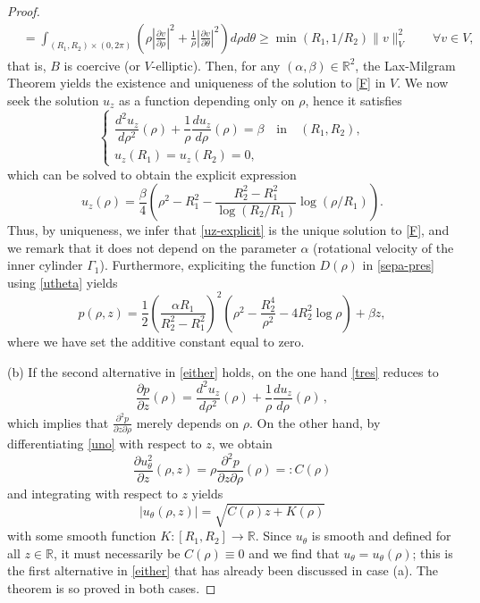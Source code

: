 \documentclass[a4paper,11pt]{amsart}
\numberwithin{equation}{section}
\numberwithin{figure}{section}
\begin{document}
\begin{proof}
\begin{equation*}
\begin{aligned}
				&= \int_{(R_1,R_2)\times (0,2\pi)} \left( \rho \left|\frac{\partial v}{\partial \rho}\right|^2 + \frac{1}{\rho}\left|\frac{\partial v}{\partial \theta}\right|^2  \right) d\rho d\theta\geq \min (R_1, 1/R_2)\|v\|^2_V\qquad\forall v\in V,
			\end{aligned}
		\end{equation*} that is, $B$ is coercive (or $V$-elliptic). Then, for any $(\alpha, \beta)\in \mathbb{R}^2$, the Lax-Milgram Theorem yields the existence and uniqueness of the solution to \eqref{F} in $V$. We now seek the solution $u_z$ as a function depending only on $\rho$, hence it satisfies
		\begin{equation*}
			\begin{cases}
				\dfrac{d^2 {u_z}}{d\rho^2}(\rho) +\dfrac{1}{\rho}\dfrac{d{u_z}}{d\rho}(\rho) =\beta \quad \text{in} \quad (R_1,R_2),\\[5pt]
				{u}_{z}(R_1)=  {u}_{z}(R_2)=0,
			\end{cases}
		\end{equation*}which can be solved to obtain the explicit expression
		\begin{equation}\label{uz-explicit}
			{u}_{z}(\rho)=  \frac{\beta}{4} \left(\rho^2-R_1^2 - \frac{R_2^2-R_1^2}{\log (R_2/R_1)}   \log (\rho/R_1)\right).
		\end{equation}
		Thus, by uniqueness, we infer that \eqref{uz-explicit} is the unique solution to \eqref{F}, and we remark that it does not depend on the parameter $\alpha$ (rotational velocity of the inner cylinder $\Gamma_1$).	
		Furthermore, expliciting the function $D(\rho)$ in \eqref{sepa-pres} using \eqref{utheta} yields
		\begin{equation*}
			p(\rho,z)=   \frac{1}{2}\left(\frac{\alpha R_1}{R_2^2-R_1^2} \right)^{2} \left( \rho^{2} - \frac{R_2^4}{\rho^{2}}
			- 4R_2^2 \log\rho \right) + \beta z,
		\end{equation*}
		where we have set the additive constant equal to zero.
		
		(b) If the second alternative in \eqref{either} holds, on the one hand \eqref{tres} reduces to
		$$
		\frac{\partial p}{\partial z}(\rho) = \frac{d^2 u_z}{d\rho^2}(\rho)+\frac{1}{\rho}\frac{d u_z}{d\rho}(\rho)\,,
		$$
		which implies that $\tfrac{\partial^2p}{\partial z\partial\rho}$ merely depends on $\rho$. On the other hand, by differentiating \eqref{uno} with respect to $z$, we obtain
		$$
		\frac{\partial u^2_{\theta}}{\partial z}(\rho,z)=\rho\frac{\partial^2p}{\partial z\partial\rho}(\rho)=: C(\rho)
		$$and integrating with respect to $z$ yields
		\begin{equation}
			| u_\theta (\rho,z)|= \sqrt{C(\rho)z + K(\rho)}
		\end{equation}
		with some smooth function $K: [R_1,R_2] \rightarrow \mathbb{R}$. Since $u_\theta$ is smooth and defined for all $z\in\mathbb{R}$, it must
		necessarily be $C(\rho)\equiv 0$ and we find that $u_\theta=u_\theta(\rho)$; this is the first alternative in \eqref{either}
		that has already been discussed in case (a). The theorem is so proved in both cases.\end{proof}
	
\end{document}
